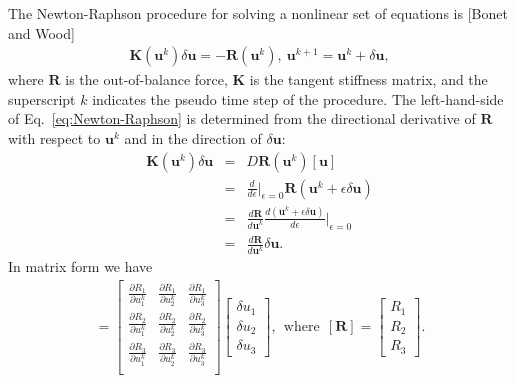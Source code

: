 \documentclass[12pt,aps,pre]{revtex4}
\begin{document}
The Newton-Raphson procedure for solving a nonlinear set of equations is [Bonet and Wood]
%
\begin{eqnarray}
\pmb{K}(\pmb{u}^k) \delta \pmb{u} = - \pmb{R}(\pmb{u}^k), \ \pmb{u}^{k+1} = \pmb{u}^k + \delta \pmb{u},
\label{eq:Newton-Raphson}
\end{eqnarray}
%
where $\pmb{R}$ is the out-of-balance force, $\pmb{K}$ is the tangent stiffness matrix, and the superscript $k$ indicates the pseudo time step of the procedure. The left-hand-side of  Eq.\ \eqref{eq:Newton-Raphson} is determined from the directional derivative of $\pmb{R}$ with respect to $\pmb{u}^k$ and in the direction of $\delta \pmb{u}$:
%
\begin{eqnarray}
\pmb{K}(\pmb{u}^k) \delta \pmb{u} &=& D\pmb{R}(\pmb{u}^k)[\pmb{u}] \nonumber\\
%
&=& \frac{d}{d\epsilon} \bigg|_{\epsilon=0}\pmb{R}(\pmb{u}^k + \epsilon \delta \pmb{u}) \nonumber\\
&=& \frac{d \pmb{R}}{d\pmb{u}^k} \frac{d(\pmb{u}^k + \epsilon \delta \pmb{u})}{d\epsilon} \bigg|_{\epsilon=0} \nonumber\\
&=& \frac{d \pmb{R}}{d\pmb{u}^k} \delta \pmb{u}.
\label{eq:DR[u]}
\end{eqnarray}
%
In matrix form we have
%
\begin{eqnarray}
[\pmb{K}(\pmb{u}^k)][\delta \pmb{u}] =
%
\begin{bmatrix}
\frac{\partial R_1}{\partial u_1^k} & \frac{\partial R_1}{\partial u_2^k} & \frac{\partial R_1}{\partial u_3^k} \\
%
\frac{\partial R_2}{\partial u_1^k} & \frac{\partial R_2}{\partial u_2^k} & \frac{\partial R_2}{\partial u_3^k} \\
%
\frac{\partial R_3}{\partial u_1^k} & \frac{\partial R_3}{\partial u_2^k} & \frac{\partial R_3}{\partial u_3^k} \\
\end{bmatrix}
%
\begin{bmatrix}
\delta u_1 \\ \delta u_2 \\ \delta u_3
\end{bmatrix}, \ \ \text{where} \ \ 
%
[\pmb{R}] = 
\begin{bmatrix}
R_1 \\ R_2 \\ R_3
\end{bmatrix}.
\label{eq:DR[u]_matrix}
\end{eqnarray}
%
\end{document}
